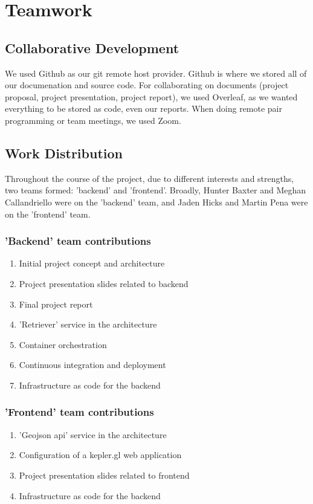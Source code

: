 \section{Teamwork}
\subsection{Collaborative Development}
We used Github as our git remote host provider. %
Github is where we stored all of our documenation and source code. 
For collaborating on documents (project proposal, project presentation, project report), we used Overleaf, as we wanted everything to be stored as code, even our reports.
When doing remote pair programming or team meetings, we used Zoom.

\subsection{Work Distribution}
Throughout the course of the project, due to different interests and strengths, two teams formed: 'backend' and 'frontend'.
Broadly, Hunter Baxter and Meghan Callandriello were on the 'backend' team, and Jaden Hicks and Martin Pena were on the 'frontend' team. 

\subsubsection{'Backend' team contributions}
\begin{enumerate}[i]
    \item Initial project concept and architecture
    \item Project presentation slides related to backend
    \item Final project report
    \item 'Retriever' service in the architecture
    \item Container orchestration
    \item Continuous integration and deployment
    \item Infrastructure as code for the backend
\end{enumerate}

\subsubsection{'Frontend' team contributions}
\begin{enumerate}[i]
    \item 'Geojson api' service in the architecture
    \item Configuration of a kepler.gl web application
    \item Project presentation slides related to frontend
    \item Infrastructure as code for the backend
\end{enumerate}